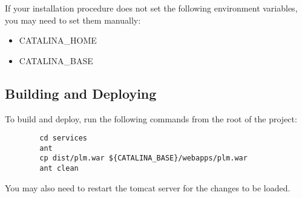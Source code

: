 \documentclass{article}
\begin{document}
	If your installation procedure does not set the following environment variables, you may need to set them manually:
	\begin{itemize}
		\item{CATALINA\_HOME}
		\item{CATALINA\_BASE}
	\end{itemize}

	\subsection{Building and Deploying}

	To build and deploy, run the following commands from the root of the project:

	\begin{minipage}{0.95\textwidth}\begin{lstlisting}
	    cd services
	    ant
	    cp dist/plm.war ${CATALINA_BASE}/webapps/plm.war
	    ant clean
	\end{lstlisting}\end{minipage}

	You may also need to restart the tomcat server for the changes to be loaded.
\end{document}
